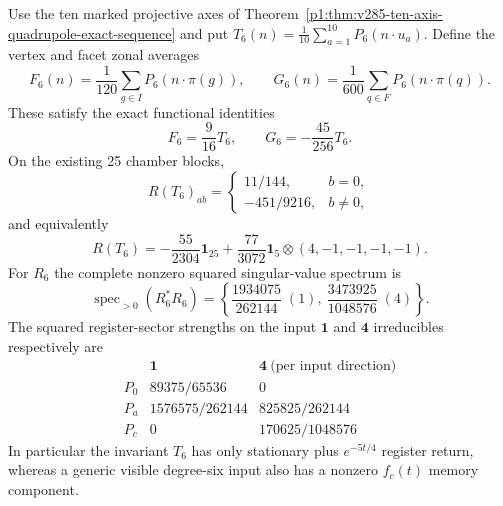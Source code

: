 \documentclass[11pt]{article}
\begin{document}
\begin{theorem}
\label{p1b:thm:cc18-degree-six-sector-split}
Use the ten marked projective axes of
Theorem~\ref{p1:thm:v285-ten-axis-quadrupole-exact-sequence} and put
$T_6(n)=\tfrac1{10}\sum_{a=1}^{10}P_6(n\cdot u_a)$.
Define the vertex and facet zonal averages
\[
F_6(n)=\frac1{120}\sum_{g\in I}P_6(n\cdot\pi(g)),\qquad
G_6(n)=\frac1{600}\sum_{q\in F}P_6(n\cdot\pi(q)).
\]
These satisfy the exact functional identities
\[
\boxed{F_6=\frac9{16}T_6,\qquad G_6=-\frac{45}{256}T_6.}
\]
On the existing 25 chamber blocks,
\[
\boxed{R(T_6)_{ab}=\begin{cases}
 11/144,&b=0,\\ -451/9216,&b\ne0,
\end{cases}}
\]
and equivalently
\[
R(T_6)=-\frac{55}{2304}\mathbf1_{25}
+\frac{77}{3072}\mathbf1_5\otimes(4,-1,-1,-1,-1).
\]
For $R_6$ the complete nonzero squared singular-value spectrum is
\[
\boxed{\operatorname{spec}_{>0}(R_6^*R_6)
=\left\{\frac{1934075}{262144}\;(1),\ 
\frac{3473925}{1048576}\;(4)\right\}.}
\]
The squared register-sector strengths on the input $\mathbf1$ and
$\mathbf4$ irreducibles respectively are
\[
\begin{array}{c|cc}
 &\mathbf1&\mathbf4\ \text{(per input direction)}\\\hline
P_0&89375/65536&0\\
P_a&1576575/262144&825825/262144\\
P_c&0&170625/1048576
\end{array}
\]
In particular the invariant $T_6$ has only stationary plus
$e^{-5t/4}$ register return, whereas a generic visible degree-six
input also has a nonzero $f_c(t)$ memory component.
\end{theorem}
\end{document}
